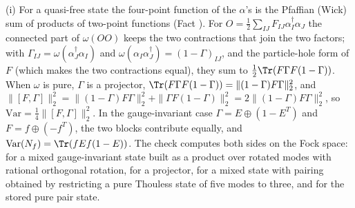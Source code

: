 (i) For a quasi-free state the four-point function of the $\alpha$'s is the Pfaffian (Wick) sum of products of two-point functions (Fact ). For $O = \tfrac12\sum_{IJ}F_{IJ}\alpha_{I}^{\dagger}\alpha_{J}$ the connected part of $\omega(OO)$ keeps the two contractions that join the two factors; with $\Gamma_{IJ} = \omega(\alpha_{J}^{\dagger}\alpha_{I})$ and $\omega(\alpha_{I}\alpha_{J}^{\dagger}) = (1 - \Gamma)_{IJ}$, and the particle-hole form of $F$ (which makes the two contractions equal), they sum to $\tfrac12\Tr(F\Gamma F(1 - \Gamma))$. When $\omega$ is pure, $\Gamma$ is a projector, $\Tr(F\Gamma F(1 - \Gamma)) = \|(1 - \Gamma)F\Gamma\|_{2}^{2}$, and $\|[F, \Gamma]\|_{2}^{2} = \|(1 - \Gamma)F\Gamma\|_{2}^{2} + \|\Gamma F(1 - \Gamma)\|_{2}^{2} = 2\|(1 - \Gamma)F\Gamma\|_{2}^{2}$, so $\mathrm{Var} = \tfrac14\|[F, \Gamma]\|_{2}^{2}$. In the gauge-invariant case $\Gamma = E \oplus (1 - E^{T})$ and $F = f \oplus (-f^{T})$, the two blocks contribute equally, and $\mathrm{Var}(N_{f}) = \Tr(fEf(1 - E))$. The check computes both sides on the Fock space: for a mixed gauge-invariant state built as a product over rotated modes with rational orthogonal rotation, for a projector, for a mixed state with pairing obtained by restricting a pure Thouless state of five modes to three, and for the stored pure pair state.

